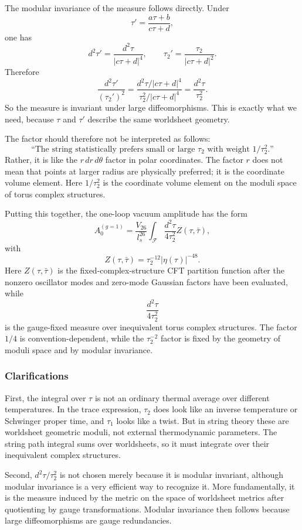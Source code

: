 \documentclass[
  10pt,
  a4paper,
  openany]{book}
\begin{document}
The modular invariance of the measure follows directly. Under \[
\tau'=\frac{a\tau+b}{c\tau+d},
\] one has \[
d^2\tau'
=
\frac{d^2\tau}{|c\tau+d|^4},
\qquad
\tau_2'
=
\frac{\tau_2}{|c\tau+d|^2}.
\] Therefore \[
\frac{d^2\tau'}{(\tau_2')^2}
=
\frac{d^2\tau/|c\tau+d|^4}
{\tau_2^2/|c\tau+d|^4}
=
\frac{d^2\tau}{\tau_2^2}.
\] So the measure is invariant under large diffeomorphisms. This is
exactly what we need, because \(\tau\) and \(\tau'\) describe the same
worldsheet geometry.

The factor should therefore not be interpreted as follows: \[
\text{``The string statistically prefers small or large }\tau_2\text{ with weight }1/\tau_2^2\text{.''}
\] Rather, it is like the \(r\,dr\,d\theta\) factor in polar
coordinates. The factor \(r\) does not mean that points at larger radius
are physically preferred; it is the coordinate volume element. Here
\(1/\tau_2^2\) is the coordinate volume element on the moduli space of
torus complex structures.

Putting this together, the one-loop vacuum amplitude has the form \[
A_0^{(g=1)}
=
\frac{V_{26}}{l_s^{26}}
\int_{\mathcal F}
\frac{d^2\tau}{4\tau_2^2}
Z(\tau,\bar\tau),
\] with \[
Z(\tau,\bar\tau)
=
\tau_2^{-12}|\eta(\tau)|^{-48}.
\] Here \(Z(\tau,\bar\tau)\) is the fixed-complex-structure CFT
partition function after the nonzero oscillator modes and zero-mode
Gaussian factors have been evaluated, while \[
\frac{d^2\tau}{4\tau_2^2}
\] is the gauge-fixed measure over inequivalent torus complex
structures. The factor \(1/4\) is convention-dependent, while the
\(\tau_2^{-2}\) factor is fixed by the geometry of moduli space and by
modular invariance.

\subsubsection{Clarifications}\label{clarifications}

First, the integral over \(\tau\) is not an ordinary thermal average
over different temperatures. In the trace expression, \(\tau_2\) does
look like an inverse temperature or Schwinger proper time, and
\(\tau_1\) looks like a twist. But in string theory these are worldsheet
geometric moduli, not external thermodynamic parameters. The string path
integral sums over worldsheets, so it must integrate over their
inequivalent complex structures.

Second, \(d^2\tau/\tau_2^2\) is not chosen merely because it is modular
invariant, although modular invariance is a very efficient way to
recognize it. More fundamentally, it is the measure induced by the
metric on the space of worldsheet metrics after quotienting by gauge
transformations. Modular invariance then follows because large
diffeomorphisms are gauge redundancies.
\end{document}
